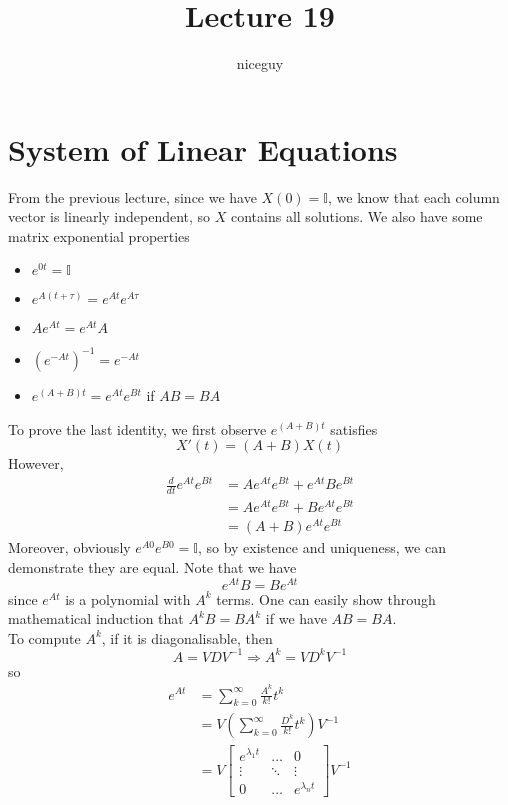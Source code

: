 \documentclass[12pt]{article}
\author{niceguy}
\title{Lecture 19}
\begin{document}
\maketitle

\section{System of Linear Equations}

From the previous lecture, since we have $X(0) = \mathbb{I}$, we know that each column vector is linearly independent, so $X$ contains all solutions. We also have some matrix exponential properties

\begin{itemize}
	\item $e^{0t} = \mathbb{I}$
	\item $e^{A(t+\tau)} = e^{At}e^{A\tau}$
	\item $Ae^{At} = e^{At}A$
	\item $\left(e^{-At}\right)^{-1} = e^{-At}$
	\item $e^{(A+B)t} = e^{At}e^{Bt}$ if $AB = BA$
\end{itemize}

To prove the last identity, we first observe $e^{(A+B)t}$ satisfies
$$X'(t) = (A+B)X(t)$$
However,
\begin{align*}
	\frac{d}{dt} e^{At}e^{Bt} &= Ae^{At}e^{Bt} + e^{At}Be^{Bt} \\
				  &= Ae^{At}e^{Bt} + Be^{At}e^{Bt} \\
				  &= (A+B)e^{At}e^{Bt}
\end{align*}
Moreover, obviously $e^{A0}e^{B0} = \mathbb{I}$, so by existence and uniqueness, we can demonstrate they are equal. Note that we have
$$e^{At}B = Be^{At}$$
since $e^{At}$ is a polynomial with $A^k$ terms. One can easily show through mathematical induction that $A^kB = BA^k$ if we have $AB = BA$. \\
To compute $A^k$, if it is diagonalisable, then
$$A = VDV^{-1} \Rightarrow A^k = VD^kV^{-1}$$
so
\begin{align*}
	e^{At} &= \sum_{k=0}^\infty \frac{A^k}{k!}t^k \\
	       &= V\left(\sum_{k=0}^\infty \frac{D^k}{k!}t^k\right)V^{-1} \\
	       &= V\begin{bmatrix} e^{\lambda_1t} & \dots & 0 \\ \vdots & \ddots & \vdots \\ 0 & \dots & e^{\lambda_nt}\end{bmatrix}V^{-1}
\end{align*}
\end{document}
